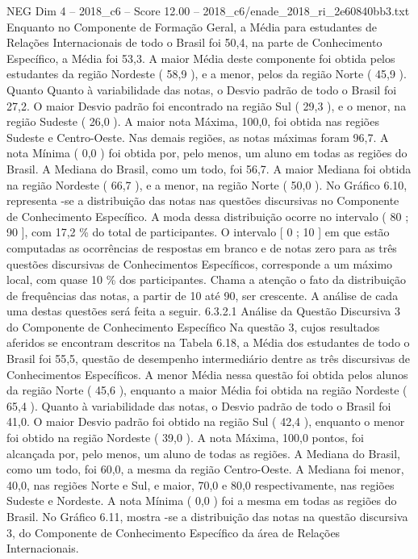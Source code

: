 \begin{textsample}{NEG Dim 4 – 2018\_c6 – Score 12.00 – 2018\_c6/enade\_2018\_ri\_2e60840bb3.txt}
Enquanto no Componente de Formação Geral, a Média para estudantes de Relações Internacionais de todo o Brasil foi 50,4, na parte de Conhecimento Específico, a Média foi 53,3.
A maior Média deste componente foi obtida pelos estudantes da região Nordeste ( 58,9 ), e a menor, pelos da região Norte ( 45,9 ).
Quanto Quanto à variabilidade das notas, o Desvio padrão de todo o Brasil foi 27,2.
O maior Desvio padrão foi encontrado na região Sul ( 29,3 ), e o menor, na região Sudeste ( 26,0 ).
A maior nota Máxima, 100,0, foi obtida nas regiões Sudeste e Centro-Oeste.
Nas demais regiões, as notas máximas foram 96,7.
A nota Mínima ( 0,0 ) foi obtida por, pelo menos, um aluno em todas as regiões do Brasil.
A Mediana do Brasil, como um todo, foi 56,7.
A maior Mediana foi obtida na região Nordeste ( 66,7 ), e a menor, na região Norte ( 50,0 ).
No Gráfico 6.10, representa -se a distribuição das notas nas questões discursivas no Componente de Conhecimento Específico.
A moda dessa distribuição ocorre no intervalo ( 80 ; 90 ], com 17,2 \% do total de participantes.
O intervalo [ 0 ; 10 ] em que estão computadas as ocorrências de respostas em branco e de notas zero para as três questões discursivas de Conhecimentos Específicos, corresponde a um máximo local, com quase 10 \% dos participantes.
Chama a atenção o fato da distribuição de frequências das notas, a partir de 10 até 90, ser crescente.
A análise de cada uma destas questões será feita a seguir. 6.3.2.1 Análise da Questão Discursiva 3 do Componente de Conhecimento Específico Na questão 3, cujos resultados aferidos se encontram descritos na Tabela 6.18, a Média dos estudantes de todo o Brasil foi 55,5, questão de desempenho intermediário dentre as três discursivas de Conhecimentos Específicos.
A menor Média nessa questão foi obtida pelos alunos da região Norte ( 45,6 ), enquanto a maior Média foi obtida na região Nordeste ( 65,4 ).
Quanto à variabilidade das notas, o Desvio padrão de todo o Brasil foi 41,0.
O maior Desvio padrão foi obtido na região Sul ( 42,4 ), enquanto o menor foi obtido na região Nordeste ( 39,0 ).
A nota Máxima, 100,0 pontos, foi alcançada por, pelo menos, um aluno de todas as regiões.
A Mediana do Brasil, como um todo, foi 60,0, a mesma da região Centro-Oeste.
A Mediana foi menor, 40,0, nas regiões Norte e Sul, e maior, 70,0 e 80,0 respectivamente, nas regiões Sudeste e Nordeste.
A nota Mínima ( 0,0 ) foi a mesma em todas as regiões do Brasil.
No Gráfico 6.11, mostra -se a distribuição das notas na questão discursiva 3, do Componente de Conhecimento Específico da área de Relações Internacionais.

\end{textsample}
